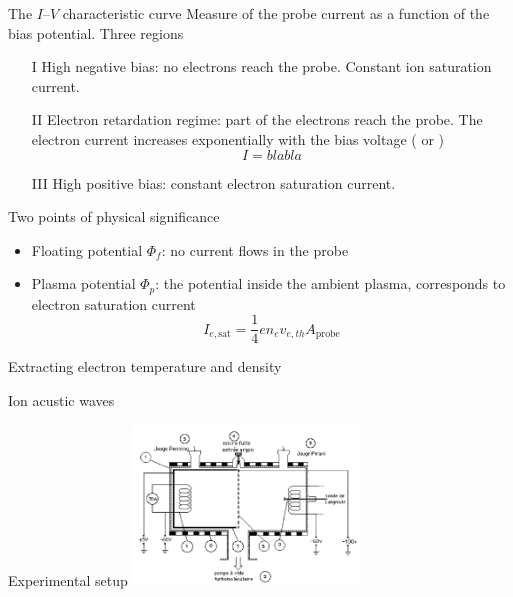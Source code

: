 \documentclass[10pt]{beamer}
\newcommand{\electronsaturationcurrent}[0]{\ensuremath{I_{e,{\mathrm{sat}}}}}
\begin{document}
\begin{frame}{The $I$--$V$ characteristic curve}
    Measure of the probe current as a function of the bias potential.
    Three regions
    \begin{enumerate}
        \item[I] High negative bias: no electrons reach the probe. Constant ion saturation current.
        \item[II] Electron retardation regime: part of the electrons reach the probe. The electron current increases exponentially with the bias voltage ( or )
            \begin{equation*}
                I = blabla
            \end{equation*}
        \item[III] High positive bias: constant electron saturation current.
    \end{enumerate}
    Two points of physical significance
    \begin{itemize}
        \item Floating potential $\Phi_f$: no current flows in the probe
        \item Plasma potential $\Phi_p$: the potential inside the ambient plasma, corresponds to electron saturation current
            \begin{equation*}
                \electronsaturationcurrent = \frac{1}{4}e n_e v_{e,th} A_{\mathrm{probe}}
            \end{equation*}
    \end{itemize}
\end{frame}

\begin{frame}{Extracting electron temperature and density}

\end{frame}


\begin{frame}{Ion acustic waves}
    
\end{frame}


\begin{frame}{Experimental setup}
    \includegraphics[width=6cm]{../figures/experimental-setup.png}
\end{frame}
\end{document}
